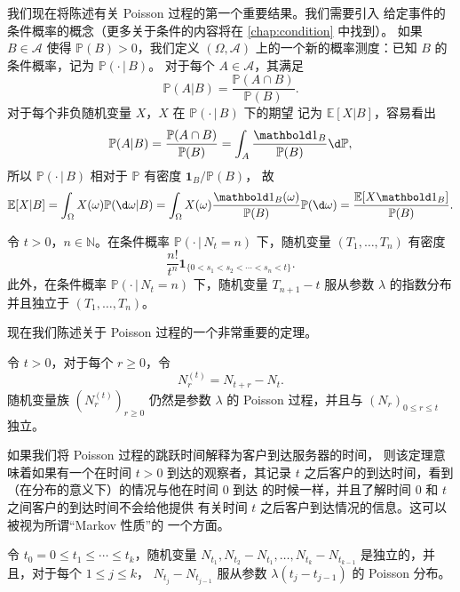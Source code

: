 \documentclass[fontset=none]{Notes}
\newcommand{\indicator}[1]{\mathbold 1_{#1}}
\begin{document}
我们现在将陈述有关 Poisson 过程的第一个重要结果。我们需要引入
给定事件的条件概率的概念（更多关于条件的内容将在 \autoref{chap:condition} 中找到）。
如果 $B\in \mathcal{A}$ 使得 $\mathbb{P}(B)>0$，我们定义 $(\Omega,\mathcal{A})$
上的一个新的概率测度：已知 $B$ 的条件概率，记为 $\mathbb{P}(\cdot\,|\, B)$。
对于每个 $A\in \mathcal{A}$，其满足
\[
  \mathbb{P}(A|B)=\frac{\mathbb{P}(A\cap B)}{\mathbb{P}(B)}.  
\]
对于每个非负随机变量 $X$，$X$ 在 $\mathbb{P}(\cdot\,|\, B)$ 下的期望
记为 $\mathbb{E}[X|B]$，容易看出
\[
  \mathbb{P}(A|B)=  \frac{\mathbb{P}(A\cap B)}{\mathbb{P}(B)}
  =\int_{A}\frac{\indicator{B}}{\mathbb{P}(B)}\d \mathbb{P},
\]
所以 $\mathbb{P}(\cdot\,|\, B)$ 相对于 $\mathbb{P}$ 有密度 $\indicator{B}/\mathbb{P}(B)$，
故
\[
  \mathbb{E}[X|B]=\int_{\Omega} X(\omega) \mathbb{P}(\d\omega|B)
  = \int_\Omega X(\omega)\frac{\indicator{B}(\omega)}{\mathbb{P}(B)}
  \mathbb{P}(\d\omega)=\frac{\mathbb{E}[X\indicator{B}]}{\mathbb{P}(B)}. 
\]

\begin{proposition}
  令 $t>0$，$n\in \mathbb{N}$。在条件概率 $\mathbb{P}(\cdot\,|\, N_t=n)$
  下，随机变量 $(T_1,\dots,T_n)$ 有密度
  \[
    \frac{n!}{t^n}\indicator{\{0<s_1<s_2<\cdots<s_n<t\}}  .
  \]
  此外，在条件概率 $\mathbb{P}(\cdot\,|\, N_t=n)$ 下，随机变量
  $T_{n+1}-t$ 服从参数 $\lambda$ 的指数分布并且独立于 $(T_1,\dots,T_n)$。
\end{proposition}

现在我们陈述关于 Poisson 过程的一个非常重要的定理。

\begin{theorem}
  令 $t>0$，对于每个 $r\geq 0$，令
  \[
    N_r^{(t)}=N_{t+r}-N_t.  
  \]
  随机变量族 $(N_r^{(t)})_{r\geq 0}$ 仍然是参数 $\lambda$
  的 Poisson 过程，并且与 $(N_r)_{0\leq r\leq t}$ 独立。
\end{theorem}
\begin{remark}[直观解释]
  如果我们将 Poisson 过程的跳跃时间解释为客户到达服务器的时间，
  则该定理意味着如果有一个在时间 $t > 0$ 到达的观察者，其记录 $t$
  之后客户的到达时间，看到（在分布的意义下）的情况与他在时间 $0$ 到达
  的时候一样，并且了解时间 $0$ 和 $t$ 之间客户的到达时间不会给他提供
  有关时间 $t$ 之后客户到达情况的信息。这可以被视为所谓“Markov 性质”的
  一个方面。
\end{remark}

\begin{corollary}
  令 $t_0=0\leq t_1\leq\cdots\leq t_k$，随机变量 $N_{t_1},N_{t_2}-N_{t_1},
  \dots,N_{t_k}-N_{t_{k-1}}$ 是独立的，并且，对于每个 $1\leq j\leq k$，
  $N_{t_j}-N_{t_{j-1}}$ 服从参数 $\lambda(t_j-t_{j-1})$ 的 Poisson 分布。
\end{corollary}
\end{document}
